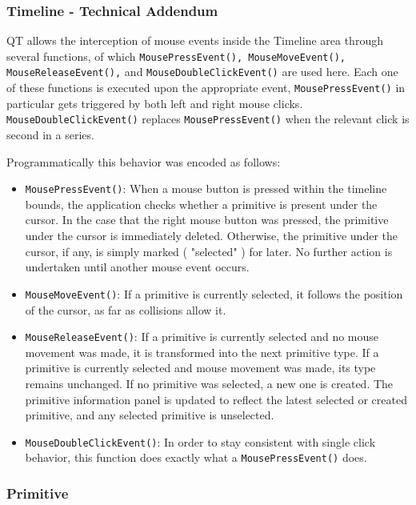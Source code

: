 \subsubsection{Timeline - Technical Addendum}

QT allows the interception of mouse events inside the Timeline area through several functions, of which \texttt{MousePressEvent(), MouseMoveEvent(), MouseReleaseEvent(),} and \texttt{MouseDoubleClickEvent()} are used here. Each one of these functions is executed upon the appropriate event, \texttt{MousePressEvent()} in particular gets triggered by both left and right mouse clicks.  \texttt{MouseDoubleClickEvent()} replaces \texttt{MousePressEvent()} when the relevant click is second in a series.

Programmatically this behavior was encoded as follows: 

\begin{itemize}
\item[] \texttt{MousePressEvent()}: When a mouse button is pressed within the timeline bounds, the application checks whether a primitive is present under the cursor. In the case that the right mouse button was pressed, the primitive under the cursor is immediately deleted. Otherwise, the primitive under the cursor, if any, is simply marked ( "selected" ) for later. No further action is undertaken until another mouse event occurs. 
\item[]  \texttt{MouseMoveEvent()}: If a primitive is currently selected, it follows the position of the cursor, as far as collisions allow it.
\item[]  \texttt{MouseReleaseEvent()}: If a primitive is currently selected and no mouse movement was made, it is transformed into the next primitive type. If a primitive is currently selected and mouse movement was made, its type remains unchanged. If no primitive was selected, a new one is created. The primitive information panel is updated to reflect the latest selected or created primitive, and any selected primitive is unselected.
\item[]  \texttt{MouseDoubleClickEvent()}: In order to stay consistent with single click behavior, this function does exactly what a \texttt{MousePressEvent()} does.
\end{itemize}


\subsubsection{Primitive}

